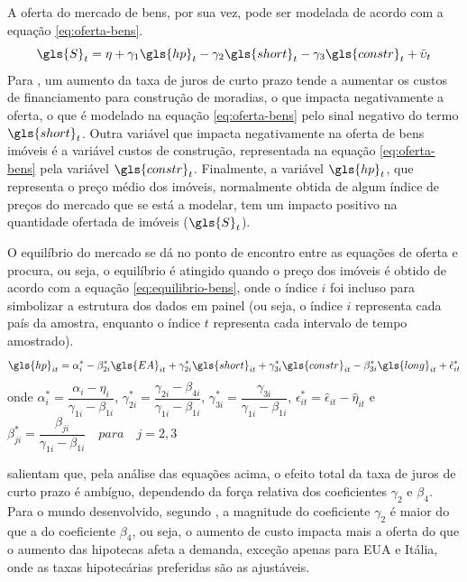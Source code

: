 \documentclass[
	12pt,				%
	oneside,			%
	a4paper,			%
	chapter=TITLE,		%
	section=TITLE,		%
	english,			%
	brazil				%
	]{abntex2}
\begin{document}
A oferta do mercado de bens, por sua vez, pode ser modelada de acordo com a
equação \eqref{eq:oferta-bens}.
\begin{equation}
\gls{S}_t = \eta + \gamma_1 \gls{hp}_t - \gamma_2 \gls{short}_t - 
\gamma_3 \gls{constr}_t + \tilde \upsilon_t
\label{eq:oferta-bens}
\end{equation}
Para \textcite[p.~7-8]{ADAMS2010}, um aumento da taxa de juros de curto prazo tende a
aumentar os custos de financiamento para construção de moradias, o que impacta
negativamente a oferta, o que é modelado na equação \eqref{eq:oferta-bens} pelo
sinal negativo do termo \(\gls{short}_t\). Outra variável que impacta
negativamente na oferta de bens imóveis é a variável custos de construção,
representada na equação \eqref{eq:oferta-bens} pela variável \(\gls{constr}_t\).
Finalmente, a variável \(\gls{hp}_t\), que representa o preço médio dos imóveis,
normalmente obtida de algum índice de preços do mercado que se está a modelar,
tem um impacto positivo na quantidade ofertada de imóveis (\(\gls{S}_t\)).

O equilíbrio do mercado se dá no ponto de encontro entre as equações de oferta e
procura, ou seja, o equilíbrio é atingido quando o preço dos imóveis é obtido de
acordo com a equação \eqref{eq:equilibrio-bens}, onde o índice \(i\) foi incluso
para simbolizar a estrutura dos dados em painel (ou seja, o índice \(i\)
representa cada país da amostra, enquanto o índice \(t\) representa cada intervalo
de tempo amostrado).
\begin{equation}
\gls{hp}_{it} = \alpha^*_i - \beta_{2i}^* \gls{EA}_{it} + 
\gamma^*_{2i} \gls{short}_{it} + \gamma^*_{3i} \gls{constr}_{it} - 
\beta^*_{3i} \gls{long}_{it} + \hat \epsilon^*_{it}
\label{eq:equilibrio-bens}
\end{equation}
onde \(\alpha^*_i = \dfrac{\alpha_i - \eta_i}{\gamma_{1i} - \beta_{1i}}\),
\(\gamma^*_{2i} = \dfrac{\gamma_{2i} - \beta_{4i}}{\gamma_{1i} - \beta_{1i}}\),
\(\gamma^*_{3i} = \dfrac{\gamma_{3i}}{\gamma_{1i}-\beta_{1i}}\),
\(\epsilon^*_{it} = \hat \epsilon_{it} - \hat \eta_{it}\) e\\
\(\beta^*_{ji} = \dfrac{\beta_{ji}}{\gamma_{1i} - \beta_{1i}} \quad para \quad j = 2, 3\)

\textcite{ADAMS2010} salientam que, pela análise das equações acima, o efeito total da taxa
de juros de curto prazo é ambíguo, dependendo da força relativa dos coeficientes
\(\gamma_2\) e \(\beta_4\). Para o mundo desenvolvido, segundo \textcite[p.~15]{ADAMS2010},
a magnitude do coeficiente \(\gamma_2\) é maior do que a do coeficiente \(\beta_4\),
ou seja, o aumento de custo impacta mais a oferta do que o aumento das hipotecas
afeta a demanda, exceção apenas para EUA e Itália, onde as taxas hipotecárias
preferidas são as ajustáveis.
\end{document}
